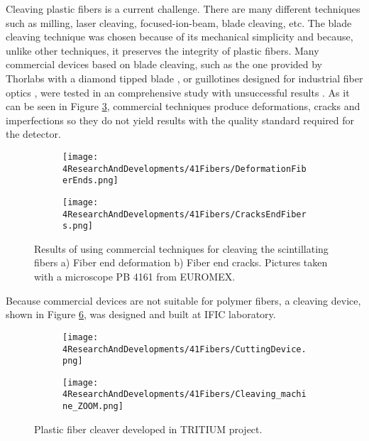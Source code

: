 Cleaving plastic fibers is a current challenge. There are many different techniques such as milling, laser cleaving, focused-ion-beam, blade cleaving, etc. The blade cleaving technique was chosen because of its mechanical simplicity and because, unlike other techniques, it preserves the integrity of plastic fibers. Many commercial devices based on blade cleaving, such as the one provided by Thorlabs with a diamond tipped blade \cite{DiamondThorlabs}, or guillotines designed for industrial fiber optics \cite{GuillotineIFO}, were tested in an comprehensive study with unsuccessful results \cite{TFGAlberto}. As it can be seen in Figure \ref{fig:BadCleavesOfFibers}, commercial techniques produce deformations, cracks and imperfections so they do not yield results with the quality standard required for the detector.
\begin{figure}
\centering
    \begin{subfigure}[b]{0.5\textwidth}
    \centering
    \texttt{[image: 4ResearchAndDevelopments/41Fibers/DeformationFiberEnds.png]}  
    \caption{\label{subfig:FiberEndDeformation}}
    \end{subfigure}
    \hfill
    \begin{subfigure}[b]{0.45\textwidth}
    \centering
    \texttt{[image: 4ResearchAndDevelopments/41Fibers/CracksEndFibers.png]}  
    \caption{\label{subfig:FiberEndCracks}}
    \end{subfigure}
 \caption{Results of using commercial techniques for cleaving the scintillating fibers a) Fiber end deformation b) Fiber end cracks. Pictures taken with a microscope PB 4161 from EUROMEX.}
 \label{fig:BadCleavesOfFibers}
\end{figure}
Because commercial devices are not suitable for polymer fibers, a cleaving device, shown in Figure \ref{fig:CleaveTRITIUMDevice}, was designed and built at IFIC laboratory.
\begin{figure}
\centering
    \begin{subfigure}[b]{0.5\textwidth}
    \centering
    \texttt{[image: 4ResearchAndDevelopments/41Fibers/CuttingDevice.png]}  
    \caption{\label{subfig:CleaveTRITIUMDevice1}}
    \end{subfigure}
    \hfill
    \begin{subfigure}[b]{0.45\textwidth}
    \centering
    \texttt{[image: 4ResearchAndDevelopments/41Fibers/Cleaving\_machine\_ZOOM.png]}  
    \caption{\label{subfig:CleaveTRITIUMDeviceZOOM}}
    \end{subfigure}
 \caption{Plastic fiber cleaver developed in TRITIUM project. \label{fig:CleaveTRITIUMDevice}}
\end{figure}
